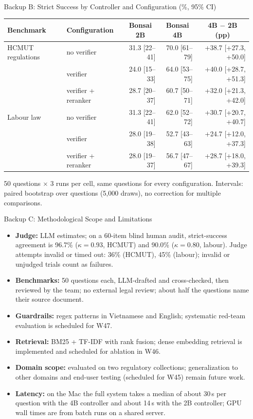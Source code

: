 \documentclass[aspectratio=1610,11pt]{beamer}
\newcommand{\cell}[1]{\multicolumn{1}{c}{#1}}
\begin{document}
\begin{frame}{Backup B: Strict Success by Controller and Configuration (\%, 95\% CI)}
  \footnotesize
  \centering
  \begin{tabular}{@{}llrrr@{}}
    \toprule Benchmark & Configuration & \cell{Bonsai 2B} & \cell{Bonsai 4B} & \cell{4B $-$ 2B (pp)}\\\midrule
    HCMUT regulations & no verifier & 31.3 [22--41] & 70.0 [61--79] & +38.7 [+27.3, +50.0]\\
    & verifier & 24.0 [15--33] & 64.0 [53--75] & +40.0 [+28.7, +51.3]\\
    & verifier + reranker & 28.7 [20--37] & 60.7 [50--71] & +32.0 [+21.3, +42.0]\\\midrule
    Labour law & no verifier & 31.3 [22--41] & 62.0 [52--72] & +30.7 [+20.7, +40.7]\\
    & verifier & 28.0 [19--38] & 52.7 [43--63] & +24.7 [+12.0, +37.3]\\
    & verifier + reranker & 28.0 [19--37] & 56.7 [47--67] & +28.7 [+18.0, +39.3]\\
    \bottomrule
  \end{tabular}
  \vspace{8pt}

  \raggedright
  50 questions $\times$ 3 runs per cell, same questions for every configuration. Intervals: paired bootstrap over questions (5,000 draws), no correction for multiple comparisons.
\end{frame}

\begin{frame}{Backup C: Methodological Scope and Limitations}
  \footnotesize
  \begin{itemize}
    \item \textbf{Judge:} LLM estimates; on a 60-item blind human audit, strict-success agreement is 96.7\% ($\kappa=0.93$, HCMUT) and 90.0\% ($\kappa=0.80$, labour). Judge attempts invalid or timed out: 36\% (HCMUT), 45\% (labour); invalid or unjudged trials count as failures.
    \item \textbf{Benchmarks:} 50 questions each, LLM-drafted and cross-checked, then reviewed by the team; no external legal review; about half the questions name their source document.
    \item \textbf{Guardrails:} regex patterns in Vietnamese and English; systematic red-team evaluation is scheduled for W47.
    \item \textbf{Retrieval:} BM25 + TF-IDF with rank fusion; dense embedding retrieval is implemented and scheduled for ablation in W46.
    \item \textbf{Domain scope:} evaluated on two regulatory collections; generalization to other domains and end-user testing (scheduled for W45) remain future work.
    \item \textbf{Latency:} on the Mac the full system takes a median of about 30\,s per question with the 4B controller and about 14\,s with the 2B controller; GPU wall times are from batch runs on a shared server.
  \end{itemize}
\end{frame}
\end{document}
